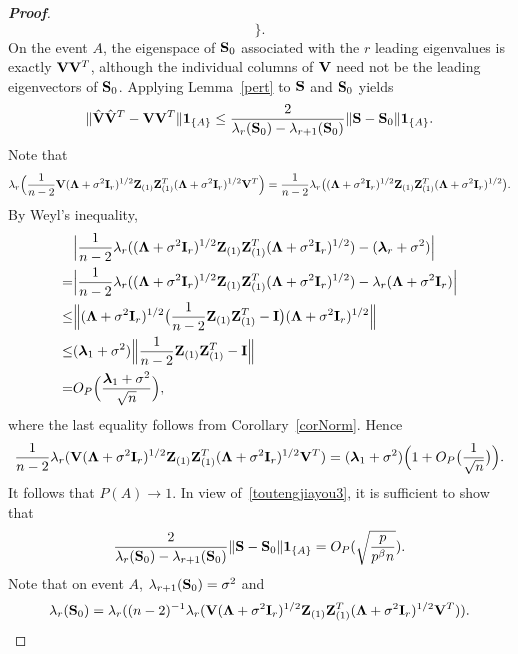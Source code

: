 \documentclass[review]{elsarticle}
\newcommand{\bZ}{\mathbf{Z}}
\newcommand{\bfsym}[1]{\ensuremath{\boldsymbol{#1}}}
\def\blambda {\bfsym {\lambda}}        \def\bLambda {\bfsym {\Lambda}}
\theoremstyle{plain}
\theoremstyle{definition}
\theoremstyle{remark}
\begin{document}
\begin{appendices}
\begin{proof}[\textbf{Proof}]
$$        \Big\}.
        $$
        On the event $A$, the eigenspace of $\mathbf{S}_0$ associated with the $r$ leading eigenvalues is exactly $\mathbf{V} \mathbf{V}^T$, although the individual columns of $\mathbf{V}$ need not be the leading eigenvectors of $\mathbf{S}_0$.
    Applying Lemma~\ref{pert} to $\mathbf{S}$ and $\mathbf{S}_0$ yields
    \begin{equation}\label{toutengjiayou3}
    \|\hat{\mathbf{V}}\hat{\mathbf{V}}^T - \mathbf{V}\mathbf{V} ^T\| \mathbf{1}_{\{A\}}\leq
        \frac{2}{\lambda_r(\mathbf{S}_0)-\lambda_{r+1}(\mathbf{S}_0)}\|\mathbf{S}-\mathbf{S}_0\|\mathbf{1}_{\{A\}}.
    \end{equation}
    Note that
$$
        \lambda_r\Big(\frac{1}{n-2}\BV(\bLambda+\sigma^2\BI_r)^{1/2}\bZ_{(1)} \bZ_{(1)}^T(\bLambda+\sigma^2\BI_r)^{1/2}\BV^T\Big)
    =
        \frac{1}{n-2}\lambda_r\big((\bLambda+\sigma^2\BI_r)^{1/2}\bZ_{(1)} \bZ_{(1)}^T(\bLambda+\sigma^2\BI_r)^{1/2}\big).
$$
By Weyl's inequality,
$$
    \begin{aligned}
        &\Big|
        \frac{1}{n-2}\lambda_r((\bLambda+\sigma^2 \BI_r)^{1/2}\bZ_{(1)} \bZ_{(1)}^T(\bLambda+\sigma^2 \BI_r)^{1/2})
    -
        (\blambda_r+\sigma^2)
    \Big|\\
        =&\Big|
    \frac{1}{n-2}\lambda_r((\bLambda+\sigma^2 \BI_r)^{1/2}\bZ_{(1)} \bZ_{(1)}^T(\bLambda+\sigma^2 \BI_r)^{1/2})
    -
    \lambda_r(\bLambda+\sigma^2\BI_r)
    \Big|
        \\
        \leq&
        \Big\|(\bLambda+\sigma^2\BI_r)^{1/2}\big(\frac{1}{n-2}\bZ_{(1)} \bZ_{(1)}^T-\BI\big)(\bLambda+\sigma^2\BI_r)^{1/2}\Big\|\\
        \leq& (\blambda_1+\sigma^2)\Big\|\frac{1}{n-2}\bZ_{(1)} \bZ_{(1)}^T-\BI\Big\|
        \\
        =& O_P\Big(\frac{\blambda_1+\sigma^2}{\sqrt{n}}\Big),
    \end{aligned}
$$
    where the last equality follows from Corollary~\ref{corNorm}.
    Hence
$$
        \frac{1}{n-2}\lambda_r(\BV(\bLambda+\sigma^2 \BI_r)^{1/2}\bZ_{(1)} \bZ_{(1)}^T(\bLambda+\sigma^2 \BI_r)^{1/2}\BV^T)
        =(\blambda_1+\sigma^2)\Big(1+O_P\big(\frac{1}{\sqrt{n}}\big)\Big).
        $$
        It follows that $P(A)\to 1$.
        In view of~\eqref{toutengjiayou3}, it is sufficient to show that
        $$
        \frac{2}{\lambda_r(\mathbf{S}_0)-\lambda_{r+1}(\mathbf{S}_0)}\|\mathbf{S}-\mathbf{S}_0\|\mathbf{1}_{\{A\}}=O_P(\sqrt{\frac{p}{p^{\beta}n }}).
        $$
        Note that on event $A$, $\lambda_{r+1}(\mathbf{S}_0)=\sigma^2$ and
        $$\lambda_r(\BS_0)=\lambda_r((n-2)^{-1}\lambda_r(\BV(\bLambda+\sigma^2 \BI_r)^{1/2}\bZ_{(1)} \bZ_{(1)}^T(\bLambda+\sigma^2 \BI_r)^{1/2}\BV^T)).$$

\end{proof}
\end{appendices}
\end{document}
